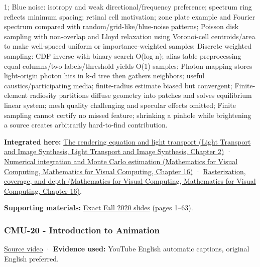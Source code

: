 1; Blue noise: isotropy and weak directional/frequency preference; spectrum ring reflects minimum spacing; retinal cell motivation; zone plate example and Fourier spectrum compared with random/grid-like/blue-noise patterns; Poisson disk sampling with non-overlap and Lloyd relaxation using Voronoi-cell centroids/area to make well-spaced uniform or importance-weighted samples; Discrete weighted sampling: CDF inverse with binary search O(log n); alias table preprocessing equal columns/two labels/threshold yields O(1) samples; Photon mapping stores light-origin photon hits in k-d tree then gathers neighbors; useful caustics/participating media; finite-radius estimate biased but convergent; Finite-element radiosity partitions diffuse geometry into patches and solves equilibrium linear system; mesh quality challenging and specular effects omitted; Finite sampling cannot certify no missed feature; shrinking a pinhole while brightening a source creates arbitrarily hard-to-find contribution.

\textbf{Integrated here:} \href{../04-Light-Transport-and-Image-Synthesis/main.pdf\#nameddest=03-visual-computing-i-ch007-the-rendering-equation-and-light-transport}{The rendering equation and light transport (Light Transport and Image Synthesis, Light Transport and Image Synthesis, Chapter 2)} · \href{../02-Mathematics-for-Visual-Computing/main.pdf\#nameddest=03-visual-computing-i-ch012-numerical-integration-and-monte-carlo-estimation}{Numerical integration and Monte Carlo estimation (Mathematics for Visual Computing, Mathematics for Visual Computing, Chapter 16)} · \href{../02-Mathematics-for-Visual-Computing/main.pdf\#nameddest=03-visual-computing-i-ch012-rasterization-coverage-and-depth}{Rasterization, coverage, and depth (Mathematics for Visual Computing, Mathematics for Visual Computing, Chapter 16)}.

\textbf{Supporting materials:} \href{https://15462.courses.cs.cmu.edu/fall2020content/lectures/19_variancereduction/19_variancereduction_slides.pdf}{Exact Fall 2020 slides} (pages 1--63).

\subsubsection{CMU-20 - Introduction to Animation}\label{04-visual-computing-ii-ch036-cmu-20---introduction-to-animation}

\href{https://www.youtube.com/watch?v=XVTw68iHef0}{Source video} · \textbf{Evidence used:} YouTube English automatic captions, original English preferred.

